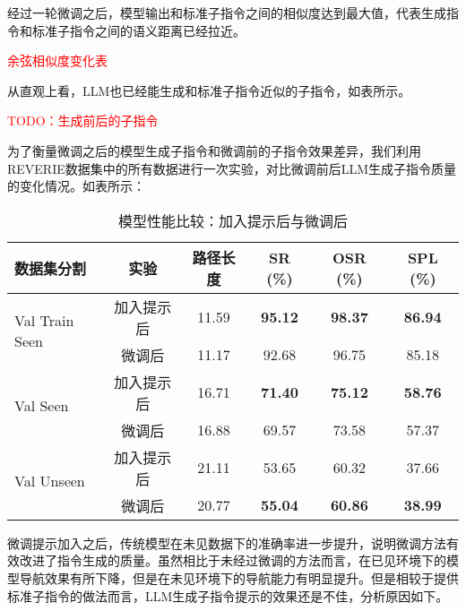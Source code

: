 \documentclass[bachelor]{thesis-uestc}
\begin{document}
经过一轮微调之后，模型输出和标准子指令之间的相似度达到最大值，代表生成指令和标准子指令之间的语义距离已经拉近。

\textcolor{red}{余弦相似度变化表}

从直观上看，LLM也已经能生成和标准子指令近似的子指令，如表所示。

\textcolor{red}{TODO：生成前后的子指令}

为了衡量微调之后的模型生成子指令和微调前的子指令效果差异，我们利用REVERIE数据集中的所有数据进行一次实验，对比微调前后LLM生成子指令质量的变化情况。如表所示：

\begin{table}[htbp]
    \centering
    \caption{模型性能比较：加入提示后与微调后}
    \label{table:model_comparison}
    \begin{tabular}{@{}lccccc@{}}
    \toprule
    \textbf{数据集分割} & \textbf{实验} & \textbf{路径长度} & \textbf{SR (\%)} & \textbf{OSR (\%)} & \textbf{SPL (\%)} \\ \midrule
    \multirow{2}{*}{Val Train Seen} & 加入提示后 & 11.59 & \textbf{95.12} & \textbf{98.37} & \textbf{86.94} \\
                                    & 微调后 & 11.17 & 92.68 & 96.75 & 85.18 \\ \midrule
    \multirow{2}{*}{Val Seen}       & 加入提示后 & 16.71 & \textbf{71.40} & \textbf{75.12} & \textbf{58.76} \\
                                    & 微调后 & 16.88 & 69.57 & 73.58 & 57.37 \\ \midrule
    \multirow{2}{*}{Val Unseen}     & 加入提示后 & 21.11 & 53.65 & 60.32 & 37.66 \\
                                    & 微调后 & 20.77 & \textbf{55.04} & \textbf{60.86} & \textbf{38.99} \\
    \bottomrule
    \end{tabular}
\end{table}

微调提示加入之后，传统模型在未见数据下的准确率进一步提升，说明微调方法有效改进了指令生成的质量。虽然相比于未经过微调的方法而言，在已见环境下的模型导航效果有所下降，但是在未见环境下的导航能力有明显提升。但是相较于提供标准子指令的做法而言，LLM生成子指令提示的效果还是不佳，分析原因如下。
\end{document}
